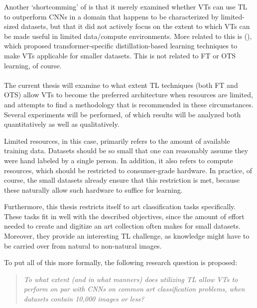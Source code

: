 Another `shortcomming' of \citeauthor{matsoukas2021time} is that it merely examined whether VTs can use TL to outperform CNNs in a domain that happens to be characterized by limited-sized datasets, but that it did not actively focus on the extent to which VTs can be made useful in limited data/compute environments. More related to this is \citeauthor{touvron2021training} (\citeyear{touvron2021training}), which proposed transformer-specific distillation-based learning techniques to make VTs applicable for smaller datasets. This is not related to FT or OTS learning, of course.
\\\\
The current thesis will examine to what extent TL techniques (both FT and OTS) allow VTs to become the preferred architecture when resources are limited, and attempts to find a methodology that is recommended in these circumstances. Several experiments will be performed, of which results will be analyzed both quantitatively as well as qualitatively.

Limited resources, in this case, primarily refers to the amount of available training data. Datasets should be so small that one can reasonably assume they were hand labeled by a single person. In addition, it also refers to compute resources, which should be restricted to consumer-grade hardware. In practice, of course, the small datasets already ensure that this restriction is met, because these naturally allow such hardware to suffice for learning.

Furthermore, this thesis restricts itself to art classification tasks specifically. These tasks fit in well with the described objectives, since the amount of effort needed to create and digitize an art collection often makes for small datasets. Moreover, they provide an interesting TL challenge, as knowledge might have to be carried over from natural to non-natural images.

To put all of this more formally, the following research question is proposed: \begin{quote}\textit{To what extent (and in what manners) does utilizing TL allow VTs to perform on par with CNNs on common art classification problems, when datasets contain 10,000 images or less?}\end{quote}
